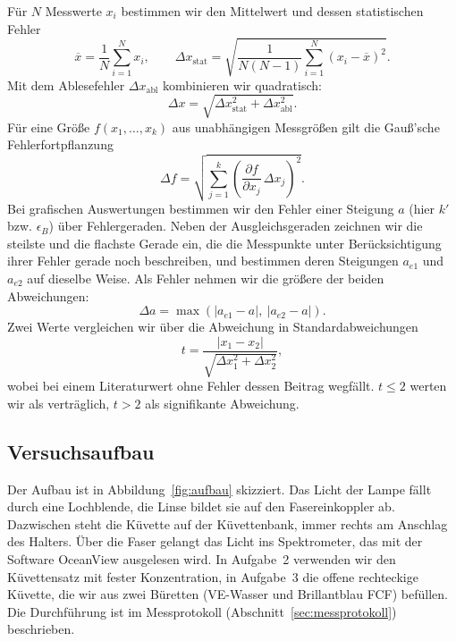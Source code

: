 \documentclass{article}
\let\OrigRef\ref
\renewcommand{\ref}[1]{{\color{linkblue}\uline{\OrigRef{#1}}}}
\begin{document}
Für $N$ Messwerte $x_i$ bestimmen wir den Mittelwert und dessen statistischen Fehler
\begin{equation}
	\overline{x} = \frac{1}{N}\sum_{i=1}^{N} x_i ,
	\qquad
	\Delta x_\text{stat} = \sqrt{\frac{1}{N(N-1)}\sum_{i=1}^{N}\left(x_i - \overline{x}\right)^2} .
	\label{eq:mittelwert}
\end{equation}
Mit dem Ablesefehler $\Delta x_\text{abl}$ kombinieren wir quadratisch:
\begin{equation}
	\Delta x = \sqrt{\Delta x_\text{stat}^2 + \Delta x_\text{abl}^2} .
	\label{eq:fehler_kombi}
\end{equation}
Für eine Größe $f(x_1, \dots, x_k)$ aus unabhängigen Messgrößen gilt die
Gauß'sche Fehlerfortpflanzung
\begin{equation}
	\Delta f = \sqrt{\sum_{j=1}^{k}
		\left(\frac{\partial f}{\partial x_j}\,\Delta x_j\right)^{2}} .
	\label{eq:gauss}
\end{equation}
Bei grafischen Auswertungen bestimmen wir den Fehler einer Steigung $a$ (hier $k'$ bzw.
$\epsilon_B$) über Fehlergeraden. Neben der Ausgleichsgeraden zeichnen wir die steilste
und die flachste Gerade ein, die die Messpunkte unter Berücksichtigung ihrer Fehler gerade
noch beschreiben, und bestimmen deren Steigungen $a_{e1}$ und $a_{e2}$ auf dieselbe Weise.
Als Fehler nehmen wir die größere der beiden Abweichungen:
\begin{equation}
	\Delta a = \max\left(\left|a_{e1} - a\right|,\ \left|a_{e2} - a\right|\right) .
	\label{eq:fehlergerade}
\end{equation}
Zwei Werte vergleichen wir über die Abweichung in Standardabweichungen
\begin{equation}
	t = \frac{\left|x_1 - x_2\right|}{\sqrt{\Delta x_1^2 + \Delta x_2^2}} ,
	\label{eq:tabweichung}
\end{equation}
wobei bei einem Literaturwert ohne Fehler dessen Beitrag wegfällt. $t \le 2$ werten wir
als verträglich, $t > 2$ als signifikante Abweichung.


\subsection{Versuchsaufbau}
\label{sec:aufbau}

Der Aufbau ist in Abbildung~\ref{fig:aufbau} skizziert. Das Licht der Lampe fällt durch
eine Lochblende, die Linse bildet sie auf den Fasereinkoppler ab. Dazwischen steht die
Küvette auf der Küvettenbank, immer rechts am Anschlag des Halters. Über die Faser gelangt
das Licht ins Spektrometer, das mit der Software OceanView ausgelesen wird. In Aufgabe~2
verwenden wir den Küvettensatz mit fester Konzentration, in Aufgabe~3 die offene
rechteckige Küvette, die wir aus zwei Büretten (VE-Wasser und Brillantblau FCF) befüllen. Die
Durchführung ist im Messprotokoll (Abschnitt~\ref{sec:messprotokoll}) beschrieben.
\end{document}
